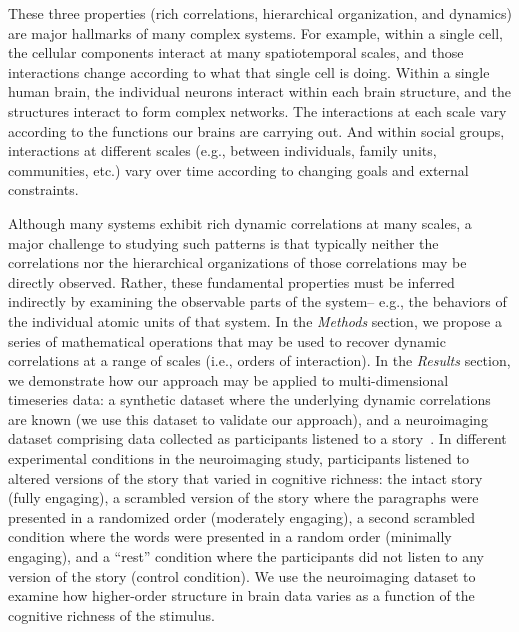 \documentclass[english]{article}
\begin{document}
These three properties (rich correlations, hierarchical organization,
and dynamics) are major hallmarks of many complex systems.  For
example, within a single cell, the cellular components interact at
many spatiotemporal scales, and those interactions change according to
what that single cell is doing.  Within a single human brain, the
individual neurons interact within each brain structure, and the
structures interact to form complex networks.  The interactions at
each scale vary according to the functions our brains are carrying
out.  And within social groups, interactions at different scales
(e.g., between individuals, family units, communities, etc.) vary over
time according to changing goals and external constraints.

Although many systems exhibit rich dynamic correlations at many
scales, a major challenge to studying such patterns is that typically
neither the correlations nor the hierarchical organizations of those
correlations may be directly observed.  Rather, these fundamental
properties must be inferred indirectly by examining the observable
parts of the system-- e.g., the behaviors of the individual atomic
units of that system.  In the \textit{Methods} section, we propose a
series of mathematical operations that may be used to recover dynamic
correlations at a range of scales (i.e., orders of interaction).  In
the \textit{Results} section, we demonstrate how our approach may be
applied to multi-dimensional timeseries data: a synthetic dataset
where the underlying dynamic correlations are known (we use this
dataset to validate our approach), and a neuroimaging dataset
comprising data collected as participants listened to a
story~\citep{SimoEtal16}.  In different experimental conditions in the
neuroimaging study, participants listened to altered versions of the
story that varied in cognitive richness: the intact story (fully
engaging), a scrambled version of the story where the paragraphs were
presented in a randomized order (moderately engaging), a second
scrambled condition where the words were presented in a random order
(minimally engaging), and a ``rest'' condition where the participants
did not listen to any version of the story (control condition).  We
use the neuroimaging dataset to examine how higher-order structure in
brain data varies as a function of the cognitive richness of the
stimulus.
\end{document}
